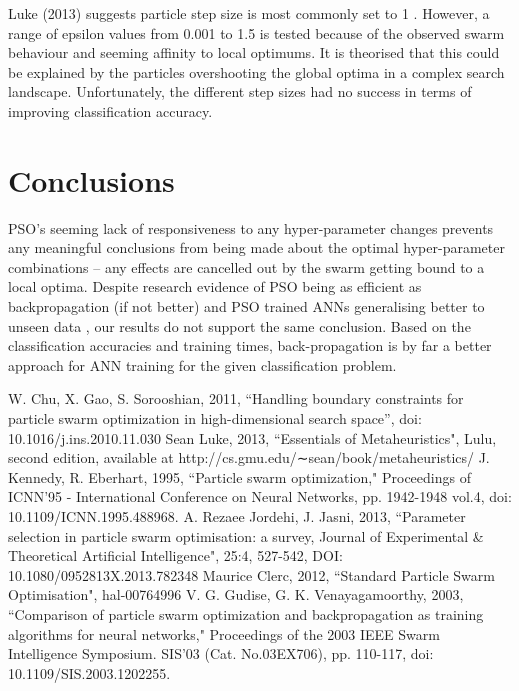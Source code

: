 \documentclass[12pt]{article}
\begin{document}
Luke (2013) suggests particle step size is most commonly set to 1 \cite{Luke}. However, a range of epsilon values from 0.001 to 1.5 is tested because of the observed swarm behaviour and seeming affinity to local optimums. It is theorised that this could be explained by the particles overshooting the global optima in a complex search landscape. Unfortunately, the different step sizes had no success in terms of improving classification accuracy.

\vspace{-1.5em}
\section{Conclusions}
\vspace{-1.5em}

PSO's seeming lack of responsiveness to any hyper-parameter changes prevents any meaningful conclusions from being made about the optimal hyper-parameter combinations -- any effects are cancelled out by the swarm getting bound to a local optima. Despite research evidence of PSO being as efficient as backpropagation (if not better) and PSO trained ANNs generalising better to unseen data \cite{Kennedy}, our results do not support the same conclusion. Based on the classification accuracies and training times, back-propagation is by far a better approach for ANN training for the given classification problem.

\vspace{-1.5em}
\begin{thebibliography}{10}

 W. Chu, X. Gao, S. Sorooshian, 2011, ``Handling boundary constraints for particle swarm optimization in high-dimensional search space'', doi: 10.1016/j.ins.2010.11.030
 Sean Luke, 2013, ``Essentials of Metaheuristics", Lulu, second edition, available at http://cs.gmu.edu/∼sean/book/metaheuristics/
 J. Kennedy, R. Eberhart, 1995, ``Particle swarm optimization," Proceedings of ICNN'95 - International Conference on Neural Networks,  pp. 1942-1948 vol.4, doi: 10.1109/ICNN.1995.488968.
 A. Rezaee Jordehi, J. Jasni, 2013, ``Parameter selection in particle swarm optimisation: a survey, Journal of Experimental \& Theoretical Artificial Intelligence", 25:4, 527-542, DOI: 10.1080/0952813X.2013.782348
 Maurice Clerc, 2012, ``Standard Particle Swarm Optimisation", hal-00764996
  V. G. Gudise, G. K. Venayagamoorthy, 2003, ``Comparison of particle swarm optimization and backpropagation as training algorithms for neural networks," Proceedings of the 2003 IEEE Swarm Intelligence Symposium. SIS'03 (Cat. No.03EX706), pp. 110-117, doi: 10.1109/SIS.2003.1202255.


\end{thebibliography}
\end{document}
